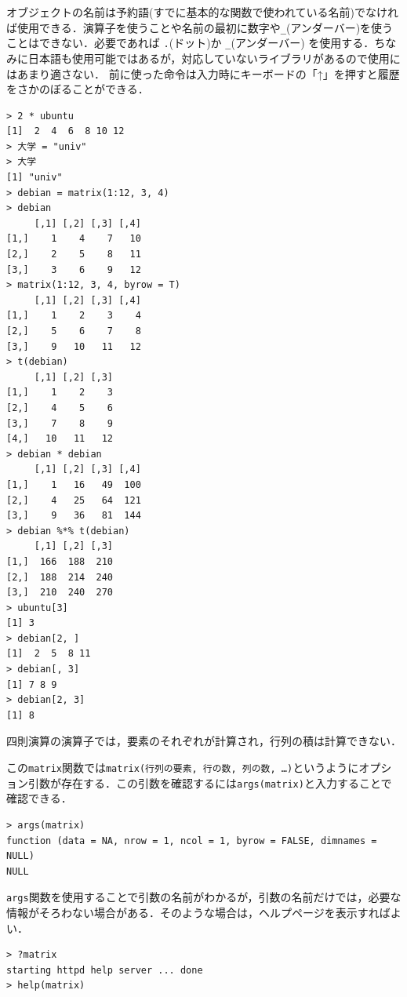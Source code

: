 オブジェクトの名前は予約語(すでに基本的な関数で使われている名前)でなければ使用できる．演算子を使うことや名前の最初に数字や\verb+_+(アンダーバー)を使うことはできない．必要であれば \verb+.+(ドット)か \verb+_+(アンダーバー) を使用する．ちなみに日本語も使用可能ではあるが，対応していないライブラリがあるので使用にはあまり適さない．
前に使った命令は入力時にキーボードの「↑」を押すと履歴をさかのぼることができる．
\begin{breakbox}
\begin{verbatim}
> 2 * ubuntu
[1]  2  4  6  8 10 12
> 大学 = "univ"
> 大学
[1] "univ"
> debian = matrix(1:12, 3, 4)
> debian
     [,1] [,2] [,3] [,4]
[1,]    1    4    7   10
[2,]    2    5    8   11
[3,]    3    6    9   12
> matrix(1:12, 3, 4, byrow = T)
     [,1] [,2] [,3] [,4]
[1,]    1    2    3    4
[2,]    5    6    7    8
[3,]    9   10   11   12
> t(debian)
     [,1] [,2] [,3]
[1,]    1    2    3
[2,]    4    5    6
[3,]    7    8    9
[4,]   10   11   12
> debian * debian
     [,1] [,2] [,3] [,4]
[1,]    1   16   49  100
[2,]    4   25   64  121
[3,]    9   36   81  144
> debian %*% t(debian)
     [,1] [,2] [,3]
[1,]  166  188  210
[2,]  188  214  240
[3,]  210  240  270
> ubuntu[3]
[1] 3
> debian[2, ]
[1]  2  5  8 11
> debian[, 3]
[1] 7 8 9
> debian[2, 3]
[1] 8
\end{verbatim}
\end{breakbox}

四則演算の演算子では，要素のそれぞれが計算され，行列の積は計算できない．

この{\tt matrix}関数では\verb+matrix(行列の要素, 行の数, 列の数, …)+というようにオプション引数が存在する．この引数を確認するには\verb+args(matrix)+と入力することで確認できる．
\begin{breakbox}
\begin{verbatim}
> args(matrix)
function (data = NA, nrow = 1, ncol = 1, byrow = FALSE, dimnames = NULL) 
NULL
\end{verbatim}
\end{breakbox}

{\tt args}関数を使用することで引数の名前がわかるが，引数の名前だけでは，必要な情報がそろわない場合がある．そのような場合は，ヘルプページを表示すればよい．
\begin{breakbox}
\begin{verbatim}
> ?matrix
starting httpd help server ... done
> help(matrix)
\end{verbatim}
\end{breakbox}

